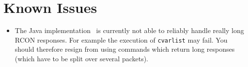 \chapter{Known Issues}
\begin{itemize}
  \item The Java implementation \steamcondenser\ is currently not able to reliably handle really long RCON responses. For example the execution of \lstinline{cvarlist} may fail. You should therefore resign from using commands which return long responses (which have to be split over several packets).
\end{itemize}